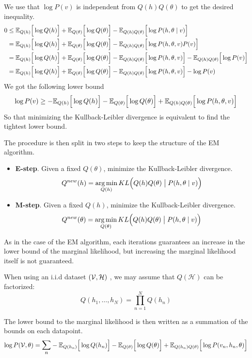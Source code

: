 We use that \(\log{P(v)}\) is independent from \(Q(h)Q(\theta)\) to get the desired inequality.
\[
  \begin{aligned}
    0 &\leq \mathbb{E}_{Q(h)}\Big[\log{Q(h)}\Big] + \mathbb{E}_{Q(\theta)}\Big[\log{Q(\theta)}\Big] - \mathbb{E}_{Q(h)Q(\theta)}\Big[\log{P(h,\theta \mid v)}\Big]\\
    &= \mathbb{E}_{Q(h)}\Big[\log{Q(h)}\Big] + \mathbb{E}_{Q(\theta)}\Big[\log{Q(\theta)}\Big] - \mathbb{E}_{Q(h)Q(\theta)}\Big[\log{P(h,\theta,v)P(v)}\Big] \\
    &=\mathbb{E}_{Q(h)}\Big[\log{Q(h)}\Big] + \mathbb{E}_{Q(\theta)}\Big[\log{Q(\theta)}\Big] - \mathbb{E}_{Q(h)Q(\theta)}\Big[\log{P(h,\theta, v)}\Big] - \mathbb{E}_{Q(h)Q(\theta)}\Big[\log{P(v)}\Big] \\
    &= \mathbb{E}_{Q(h)}\Big[\log{Q(h)}\Big] + \mathbb{E}_{Q(\theta)}\Big[\log{Q(\theta)}\Big] - \mathbb{E}_{Q(h)Q(\theta)}\Big[\log{P(h,\theta, v)}\Big] - \log{P(v)} \\
  \end{aligned}
\]
We got the following lower bound
\[
  \log{P(v)} \geq -\mathbb{E}_{Q(h)}\Big[\log{Q(h)}\Big]- \mathbb{E}_{Q(\theta)}\Big[\log{Q(\theta)}\Big] + \mathbb{E}_{Q(h)Q(\theta)}\Big[\log{P(h,\theta, v)}\Big]
\]
So that minimizing the Kullback-Leibler divergence is equivalent to find the tightest lower bound.

The procedure is then split in two steps to keep the structure of the EM algorithm.

\begin{itemize}
  \item \textbf{E-step}. Given a fixed \(Q(\theta)\), minimize the Kullback-Leibler divergence.
    \[
    Q^{new}(h) = \operatorname*{arg\,min}_{Q(h)}KL\Big(Q(h)Q(\theta) \bigm| P(h,\theta \mid v)\Big)
    \]

  \item \textbf{M-step}. Given a fixed \(Q(h)\), minimize the Kullback-Leibler divergence.
    \[
    Q^{new}(\theta) = \operatorname*{arg\,min}_{Q(\theta)}KL\Big(Q(h)Q(\theta) \bigm| P(h,\theta \mid v)\Big)
    \]
\end{itemize}

As in the case of the EM algorithm, each iterations guarantees an increase in the lower bound of the marginal likelihood, but increasing the marginal likelihood itself is not guaranteed.

When using an i.i.d dataset \((\mathcal{V}, \mathcal{H})\) , we may assume that \(Q(\mathcal{H})\) can be factorized:
\[
  Q(h_{1}, \dots, h_{N}) = \prod_{n=1}^{N}Q(h_{n})
\]

The lower bound to the marginal likelihood is then written as a summation of the bounds on each datapoint.
\[
  \log{P(\V, \theta)} = \mathlarger{\sum_{n}} -\E{Q(h_{n})}{\log{Q(h_{n})}}- \E{Q(\theta)}{\log{Q(\theta)}} + \E{Q(h_{n})Q(\theta)}{\log{P(v_{n}, h_{n},\theta)}}
\]

